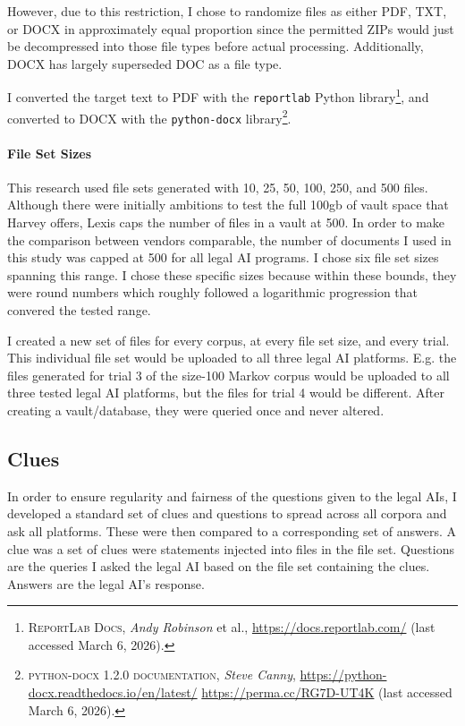 \documentclass[
]{article}
\begin{document}
However, due to this restriction, I chose to randomize files as either PDF, TXT, or DOCX in approximately equal proportion since the permitted ZIPs would just be decompressed into those file types before actual processing. Additionally, DOCX has largely superseded DOC as a file type.

I converted the target text to PDF with the \texttt{reportlab} Python library\footnote{\textsc{ReportLab Docs}, \emph{Andy Robinson} et al., \url{https://docs.reportlab.com/} (last accessed March 6, 2026).}, and converted to DOCX with the \texttt{python-docx} library\footnote{\textsc{python-docx 1.2.0 documentation}, \emph{Steve Canny}, \url{https://python-docx.readthedocs.io/en/latest/} \url{https://perma.cc/RG7D-UT4K} (last accessed March 6, 2026).}.

\paragraph{File Set Sizes}\label{file-set-sizes}

This research used file sets generated with 10, 25, 50, 100, 250, and 500 files. Although there were initially ambitions to test the full 100gb of vault space that Harvey offers, Lexis caps the number of files in a vault at 500. In order to make the comparison between vendors comparable, the number of documents I used in this study was capped at 500 for all legal AI programs. I chose six file set sizes spanning this range. I chose these specific sizes because within these bounds, they were round numbers which roughly followed a logarithmic progression that convered the tested range.

I created a new set of files for every corpus, at every file set size, and every trial. This individual file set would be uploaded to all three legal AI platforms. E.g. the files generated for trial 3 of the size-100 Markov corpus would be uploaded to all three tested legal AI platforms, but the files for trial 4 would be different. After creating a vault/database, they were queried once and never altered.

\subsection{Clues}\label{clues}

In order to ensure regularity and fairness of the questions given to the legal AIs, I developed a standard set of clues and questions to spread across all corpora and ask all platforms. These were then compared to a corresponding set of answers. A clue was a set of clues were statements injected into files in the file set. Questions are the queries I asked the legal AI based on the file set containing the clues. Answers are the legal AI's response.
\end{document}
